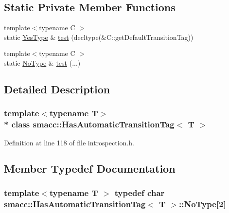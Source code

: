 \subsection*{Static Private Member Functions}
\begin{DoxyCompactItemize}
\item 
{\footnotesize template$<$typename C $>$ }\\static \hyperlink{classsmacc_1_1HasAutomaticTransitionTag_ad3b0dca13c15ca18d97bbfa0f613614c}{Yes\+Type} \& \hyperlink{classsmacc_1_1HasAutomaticTransitionTag_ad6935748633315a97a51f5ce73712b17}{test} (decltype(\&C\+::get\+Default\+Transition\+Tag))
\item 
{\footnotesize template$<$typename C $>$ }\\static \hyperlink{classsmacc_1_1HasAutomaticTransitionTag_adf9d68b94f123045a71e9a8ee31a5aa6}{No\+Type} \& \hyperlink{classsmacc_1_1HasAutomaticTransitionTag_af219b2c85ec6b7dad6862375d7c02ce8}{test} (...)
\end{DoxyCompactItemize}


\subsection{Detailed Description}
\subsubsection*{template$<$typename T$>$\\*
class smacc\+::\+Has\+Automatic\+Transition\+Tag$<$ T $>$}



Definition at line 118 of file introspection.\+h.



\subsection{Member Typedef Documentation}
\subsubsection[{\texorpdfstring{No\+Type}{NoType}}]{\setlength{\rightskip}{0pt plus 5cm}template$<$typename T $>$ typedef char {\bf smacc\+::\+Has\+Automatic\+Transition\+Tag}$<$ T $>$\+::No\+Type\mbox{[}2\mbox{]}\hspace{0.3cm}{\ttfamily [private]}}\hypertarget{classsmacc_1_1HasAutomaticTransitionTag_adf9d68b94f123045a71e9a8ee31a5aa6}{}\label{classsmacc_1_1HasAutomaticTransitionTag_adf9d68b94f123045a71e9a8ee31a5aa6}


